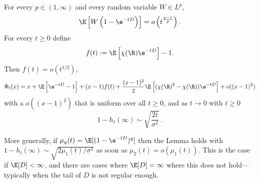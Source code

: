 \documentclass[10pt,a4paper]{article}
\newcommand{\todo}[1]{\textcolor{blue}{\textbf{TODO:} #1}}
\begin{document}
\begin{lemma}\label{lem:phit-taylor-expansion}
For every $p \in (1,\infty)$ and every random variable $W\in L^p$,
\[ \E\left[W \left(1 - \e^{-tD}\right)\right] = o\left(t^{\frac{p-1}{p}}\right) . \] 
For every $t\geq 0$ define
\[ f(t) := \E\left[\chi(\R) \e^{-tD}\right] -1 . \] 
Then $f(t) = o(t^{1/2})$, 
\begin{equation}\label{eq:phit-taylor-expansion}
\Phi_t(x) = x + \E\left[ \e^{-tD}-1 \right] + (x-1)f(t) + \frac{(x-1)^2}{2} \E\left[ (\chi(\R)^2 - \chi(\R))\e^{-t D} \right] + o((x-1)^2)
\end{equation} 
with a $o((x-1)^2)$ that is uniform over all $t\geq 0$, and as $t\to 0$ with $t\geq 0$
\begin{equation}\label{eq:htinfty-taylor-expansion}
1-h_t(\infty) \sim \sqrt{\frac{2 t}{\sigma^2}} \ .
\end{equation}
\end{lemma}


\begin{remark}
More generally, if $\mu_q(t) = \E[(1-\e^{-tD})^q ]$ then the Lemma holds with $1-h_t(\infty)\sim\sqrt{2\mu_1(t)/\sigma^2}$ as soon as $\mu_2(t) = o(\mu_1(t))$. This is the case if $\E[D]<\infty$, and there are cases where $\E[D]=\infty$ where this does not hold---typically when the tail of $D$ is not regular enough. %
\end{remark}

\end{document}
